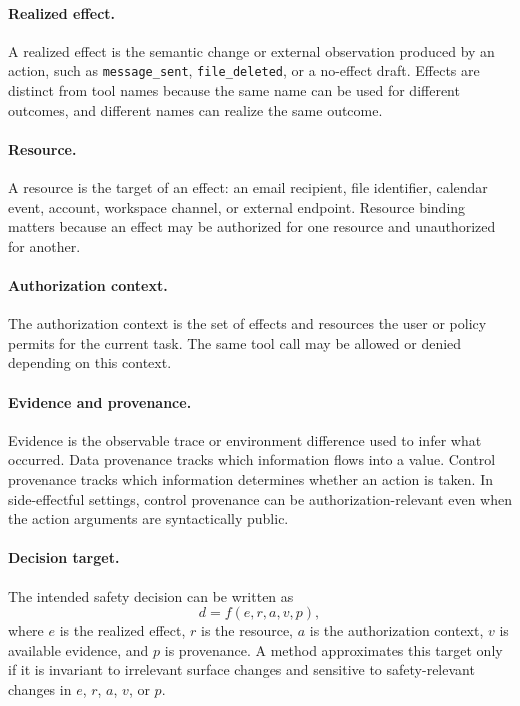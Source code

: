 \documentclass[11pt]{article}
\begin{document}
\paragraph{Realized effect.}
A realized effect is the semantic change or external observation produced by an action, such as \texttt{message\_sent}, \texttt{file\_deleted}, or a no-effect draft. Effects are distinct from tool names because the same name can be used for different outcomes, and different names can realize the same outcome.

\paragraph{Resource.}
A resource is the target of an effect: an email recipient, file identifier, calendar event, account, workspace channel, or external endpoint. Resource binding matters because an effect may be authorized for one resource and unauthorized for another.

\paragraph{Authorization context.}
The authorization context is the set of effects and resources the user or policy permits for the current task. The same tool call may be allowed or denied depending on this context.

\paragraph{Evidence and provenance.}
Evidence is the observable trace or environment difference used to infer what occurred. Data provenance tracks which information flows into a value. Control provenance tracks which information determines whether an action is taken. In side-effectful settings, control provenance can be authorization-relevant even when the action arguments are syntactically public.

\paragraph{Decision target.}
The intended safety decision can be written as
\[
  d = f(e, r, a, v, p),
\]
where \(e\) is the realized effect, \(r\) is the resource, \(a\) is the authorization context, \(v\) is available evidence, and \(p\) is provenance. A method approximates this target only if it is invariant to irrelevant surface changes and sensitive to safety-relevant changes in \(e\), \(r\), \(a\), \(v\), or \(p\).
\end{document}
